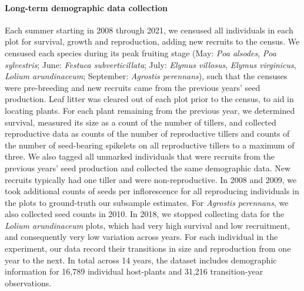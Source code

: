 \documentclass[12pt]{article}
\begin{document}
\paragraph*{Long-term demographic data collection}
Each summer starting in 2008 through 2021, we censused all individuals in each plot for survival, growth and reproduction,  adding new recruits to the census.
We censused each species during its peak fruiting stage (May: \emph{Poa alsodes}, \emph{Poa sylvestris}; June: \emph{Festuca subverticillata}; July: \emph{Elymus villosus}, \emph{Elymus virginicus}, \emph{Lolium arundinaceum}; September: \emph{Agrostis perennans}), such that the censuses were pre-breeding and new recruits came from the previous years' seed production.
Leaf litter was cleared out of each plot prior to the census, to aid in locating plants.
For each plant remaining from the previous year, we determined survival, measured its size as a count of the number of tillers, and collected reproductive data as counts of the number of reproductive tillers and counts of the number of seed-bearing spikelets on all reproductive tillers to a maximum of three. 
We also tagged all unmarked individuals that were recruits from the previous years' seed production and collected the same demographic data.
New recruits typically had one tiller and were non-reproductive. 
In 2008 and 2009, we took additional counts of seeds per inflorescence for all reproducing individuals in the plots to ground-truth our subsample estimates. 
For \emph{Agrostis perennans}, we also collected seed counts in 2010.
In 2018, we stopped collecting data for the \emph{Lolium arundinaceum} plots, which had very high survival and low recruitment, and consequently very low variation across years.
For each individual in the experiment, our data record their transitions in size and reproduction from one year to the next. 
In total across 14 years, the dataset includes demographic information for 16,789 individual host-plants and 31,216 transition-year observations.
\end{document}

